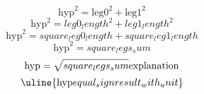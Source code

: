 \[\text{{{hyp}}}^{{2}}=\text{{{leg0}}}^{{2}}+\text{{{leg1}}}^{{2}}\]
\[\text{{{hyp}}}^{{2}}={leg0_length}^{{2}}+{leg1_length}^{{2}}\]
\[\text{{{hyp}}}^{{2}}={square_leg0_length}+{square_leg1_length}\]
\[\text{{{hyp}}}^{{2}}={square_legs_sum}\]
\[\text{{{hyp}}}=\sqrt{{\mathstrut {square_legs_sum}}}\text{{{explanation}}}\]
\[\uline{{\text{{{hyp}}}{equal_sign}{result_with_unit}}}\]